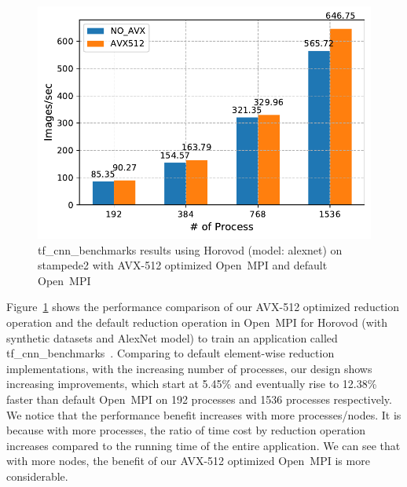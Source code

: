 \documentclass[sigconf]{acmart}
\newcommand{\ompi}[0]{Open~MPI\xspace}
\begin{document}
\begin{figure}[h]
    \centering
    \includegraphics[width=\linewidth]{horovod_tacc.pdf}
    \caption{tf\_cnn\_benchmarks results using Horovod (model: alexnet) on stampede2
    with AVX-512 optimized \ompi and default \ompi}
    \label{fig:horovod_tacc}
\end{figure}

Figure~\ref{fig:horovod_tacc} shows the performance comparison of
our AVX-512 optimized reduction operation and the default reduction operation in \ompi for Horovod (with synthetic datasets and AlexNet model) to train an application called tf\_cnn\_benchmarks~\cite{cnn_Tensorflow}.
Comparing to default element-wise reduction
implementations, with the increasing number of processes,
our design shows increasing improvements, which start at 5.45\% and
eventually rise to 12.38\% faster than default \ompi on 192 processes and 1536 processes respectively.
We notice that the performance benefit increases with more processes/nodes.
It is because with more processes, the ratio of time cost by reduction operation increases
compared to the running time of the entire application.
We can see that with more nodes, the benefit of our AVX-512 optimized \ompi is more considerable.

\end{document}

